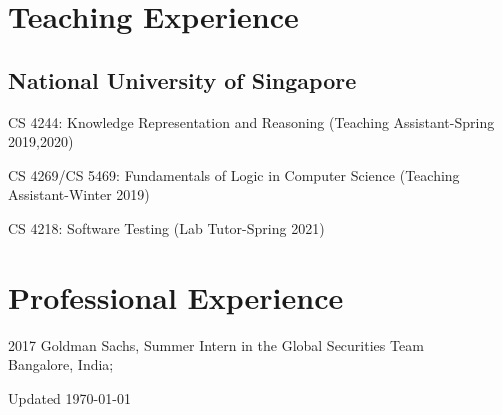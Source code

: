 \documentclass[12pt,letterpaper]{report}
\newcommand{\listitemspace}{0.15em}
\renewenvironment{itemize}
{\begin{list}{}{\setlength{\leftmargin}{0em}
            \setlength{\parskip}{0em}
            \setlength{\itemsep}{\listitemspace}
            \setlength{\parsep}{\listitemspace}}}
    {\end{list}}
\begin{document}
    \section*{Teaching Experience}

    \subsection*{National University of Singapore}
    
    \begin{itemize}
    	  	
 \item   CS 4244: Knowledge Representation and Reasoning (Teaching Assistant-Spring 2019,2020)
  \item   CS 4269/CS 5469: Fundamentals of Logic in Computer Science (Teaching Assistant-Winter 2019)
  \item   CS 4218: Software Testing (Lab Tutor-Spring 2021)
    
	\end{itemize}
    
    \section*{Professional Experience}

    \begin{tablist}

        \item[2017] \tab Goldman Sachs, Summer Intern in the Global Securities Team\\
        Bangalore, India; 



    \end{tablist}

    \begin{center}
        \vfill
        Updated \monthyeardate\today
    \end{center}
\end{document}
